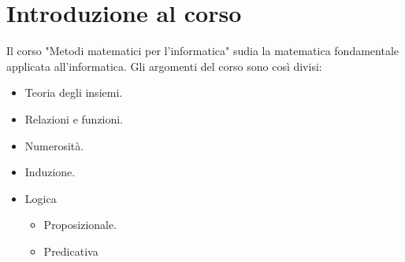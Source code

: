 \chapter{Introduzione al corso}
Il corso "Metodi matematici per l'informatica" sudia la matematica fondamentale applicata all'informatica.
Gli argomenti del corso sono così divisi:
\begin{itemize}
    \item Teoria degli insiemi.
    \item Relazioni e funzioni.
    \item Numerosità.
    \item Induzione.
    \item Logica
    \begin{itemize}
        \item Proposizionale.
        \item Predicativa
    \end{itemize}
\end{itemize}